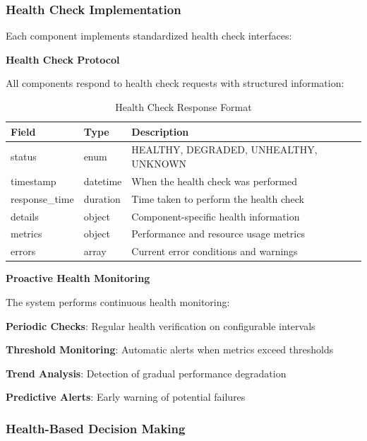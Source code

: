 \subsubsection{Health Check Implementation}

Each component implements standardized health check interfaces:

\textbf{Health Check Protocol}

All components respond to health check requests with structured information:

\begin{table}[h]
\centering
\caption{Health Check Response Format}
\label{tab:health-check-format}
\begin{tabular}{@{}lll@{}}
\toprule
\textbf{Field} & \textbf{Type} & \textbf{Description} \\
\midrule
status & enum & HEALTHY, DEGRADED, UNHEALTHY, UNKNOWN \\
timestamp & datetime & When the health check was performed \\
response\_time & duration & Time taken to perform the health check \\
details & object & Component-specific health information \\
metrics & object & Performance and resource usage metrics \\
errors & array & Current error conditions and warnings \\
\bottomrule
\end{tabular}
\end{table}

\textbf{Proactive Health Monitoring}

The system performs continuous health monitoring:

\begin{compactlist}
    \item \textbf{Periodic Checks}: Regular health verification on configurable intervals
    \item \textbf{Threshold Monitoring}: Automatic alerts when metrics exceed thresholds
    \item \textbf{Trend Analysis}: Detection of gradual performance degradation
    \item \textbf{Predictive Alerts}: Early warning of potential failures
\end{compactlist}

\subsubsection{Health-Based Decision Making}

